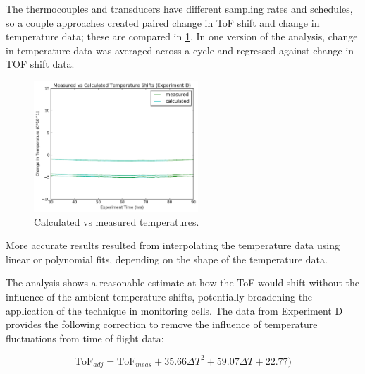 The thermocouples and transducers have different sampling rates and schedules, so a couple approaches created paired change in ToF shift and change in temperature data; these are compared in \hyperref[fig:0417temp]{\cref{fig:0417temp}}. 
In one version of the analysis, change in temperature data was averaged across a cycle and regressed against change in TOF shift data. 
\begin{figure}[h!]\label{fig:0417temp}
    \includegraphics[width=0.55\textwidth]{0417temp.png}
    \centering
    \caption{Calculated vs measured temperatures.}
\end{figure}
More accurate results resulted from interpolating the temperature data using linear or polynomial fits, depending on the shape of the temperature data.

The analysis shows a reasonable estimate at how the ToF would shift without the influence of the ambient temperature shifts, potentially broadening the application of the technique in monitoring cells. The data from Experiment D provides the following correction to remove the influence of temperature fluctuations from time of flight data:

$$ \text{ToF}_{adj} = \text{ToF}_{meas} + 35.66\Delta T^2 + 59.07\Delta T + 22.77)$$

